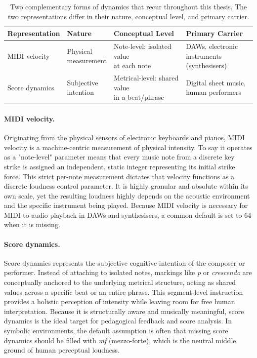 \begin{table}[b]
\centering
\caption{Two complementary forms of dynamics that recur throughout this thesis. The two representations differ in their nature, conceptual level, and primary carrier.}
\label{tab:intro_two_forms}
\fontsize{11pt}{13pt}\selectfont
\setlength{\tabcolsep}{4pt}
\renewcommand{\arraystretch}{1.2}
\begin{tabularx}{\textwidth}{llll}
\toprule
\textbf{Representation} & \textbf{Nature} & \textbf{Conceptual Level} & \textbf{Primary Carrier} \\
\midrule
MIDI velocity & \makecell[l]{Physical\\measurement} & \makecell[l]{Note-level: isolated value\\at each note} & \makecell[l]{DAWs, electronic\\instruments (synthesisers)} \\
Score dynamics & \makecell[l]{Subjective\\intention} & \makecell[l]{Metrical-level: shared value\\in a beat/phrase} & \makecell[l]{Digital sheet music,\\human performers} \\
\bottomrule
\end{tabularx}
\end{table}

\paragraph{MIDI velocity.}
Originating from the physical sensors of electronic keyboards and pianos, MIDI velocity is a machine-centric measurement of physical intensity. To say it operates as a "note-level" parameter means that every music note from a discrete key strike is assigned an independent, static integer representing its initial strike force. This strict per-note measurement dictates that velocity functions as a discrete loudness control parameter. It is highly granular and absolute within its own scale, yet the resulting loudness highly depends on the acoustic environment and the specific instrument being played. Because MIDI velocity is necessary for MIDI-to-audio playback in DAWs and synthesisers, a common default is set to 64 when it is missing.

\paragraph{Score dynamics.}
Score dynamics represents the subjective cognitive intention of the composer or performer. Instead of attaching to isolated notes, markings like \textit{p} or \textit{crescendo} are conceptually anchored to the underlying metrical structure, acting as shared values across a specific beat or an entire phrase. This segment-level instruction provides a holistic perception of intensity while leaving room for free human interpretation. Because it is structurally aware and musically meaningful, score dynamics is the ideal target for pedagogical feedback and score analysis. In symbolic environments, the default assumption is often that missing score dynamics should be filled with \textit{mf} (mezzo-forte), which is the neutral middle ground of human perceptual loudness. 


